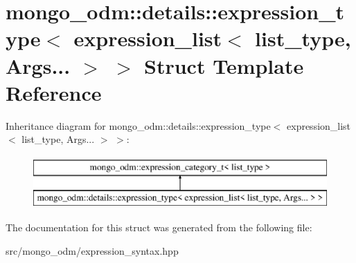 \hypertarget{structmongo__odm_1_1details_1_1expression__type_3_01expression__list_3_01list__type_00_01Args_8_8_8_01_4_01_4}{}\section{mongo\+\_\+odm\+:\+:details\+:\+:expression\+\_\+type$<$ expression\+\_\+list$<$ list\+\_\+type, Args... $>$ $>$ Struct Template Reference}
\label{structmongo__odm_1_1details_1_1expression__type_3_01expression__list_3_01list__type_00_01Args_8_8_8_01_4_01_4}
Inheritance diagram for mongo\+\_\+odm\+:\+:details\+:\+:expression\+\_\+type$<$ expression\+\_\+list$<$ list\+\_\+type, Args... $>$ $>$\+:\begin{figure}[H]
\begin{center}
\leavevmode
\includegraphics[height=2.000000cm]{structmongo__odm_1_1details_1_1expression__type_3_01expression__list_3_01list__type_00_01Args_8_8_8_01_4_01_4}
\end{center}
\end{figure}


The documentation for this struct was generated from the following file\+:\begin{DoxyCompactItemize}
\item 
src/mongo\+\_\+odm/expression\+\_\+syntax.\+hpp\end{DoxyCompactItemize}
